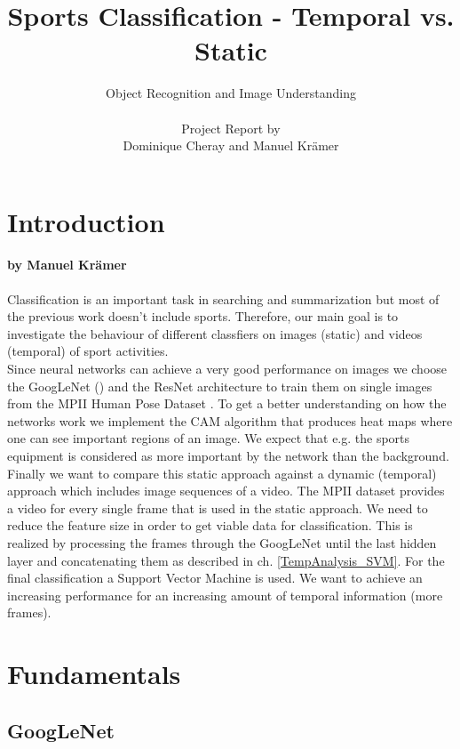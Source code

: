 \documentclass[11pt]{report}
\title{\textbf{Sports Classification - Temporal vs. Static}}
\author{Object Recognition and Image Understanding \\ \\
  Project Report by \\
  Dominique Cheray and Manuel Krämer}
\begin{document}
\maketitle

\tableofcontents
 
\chapter{Introduction}
\subsubsection{by Manuel Krämer}
Classification is an important task in searching and summarization but most of the previous work doesn't include sports. Therefore, our main goal is to investigate the behaviour of different classfiers on images (static) and videos (temporal) of sport activities. \\
Since neural networks can achieve a very good performance on images we choose the GoogLeNet (\cite{szegedy2015going}) and the ResNet \cite{he2016deep} architecture to train them on single images from the MPII Human Pose Dataset \cite{andriluka20142d}. To get a better understanding on how the networks work we implement the CAM algorithm \cite{zhou2016learning} that produces heat maps where one can see important regions of an image. We expect that e.g. the sports equipment is considered as more important by the network than the background. \\
Finally we want to compare this static approach against a dynamic (temporal) approach which includes image sequences of a video. The MPII dataset provides a video for every single frame that is used in the static approach. We need to reduce the feature size in order to get viable data for classification. This is realized by processing the frames through the GoogLeNet until the last hidden layer and concatenating them as described in ch. \ref{TempAnalysis_SVM}. For the final classification a Support Vector Machine is used. We want to achieve an increasing performance for an increasing amount of temporal information (more frames).

\chapter{Fundamentals}
\section{GoogLeNet}
\end{document}
